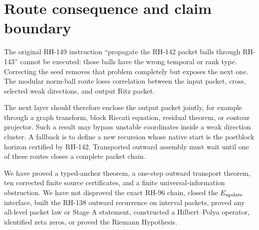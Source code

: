 \documentclass[12pt]{article}
\begin{document}
\section{Route consequence and claim boundary}
The original RH-149 instruction ``propagate the RH-142 packet balls through
RH-143'' cannot be executed: those balls have the wrong temporal or rank
type.  Correcting the seed removes that problem completely but exposes the
next one.  The modular norm-ball route loses correlation between the input
packet, cross, selected weak directions, and output Ritz packet.

The next layer should therefore enclose the output packet jointly, for
example through a graph transform, block Riccati equation, residual theorem,
or contour projector.  Such a result may bypass unstable coordinates inside
a weak direction cluster.  A fallback is to define a new recursion whose
native start is the postblock horizon certified by RH-142.  Transported
outward assembly must wait until one of these routes closes a complete packet
chain.

We have proved a typed-anchor theorem, a one-step outward transport theorem,
ten corrected finite source certificates, and a finite universal-information
obstruction.  We have not disproved the exact RH-96 chain, closed the
$E_{\rm update}$ interface, built the RH-138 outward recurrence on interval
packets, proved any all-level packet law or Stage A statement, constructed a
Hilbert--Polya operator, identified zeta zeros, or proved the Riemann
Hypothesis.



\end{document}
